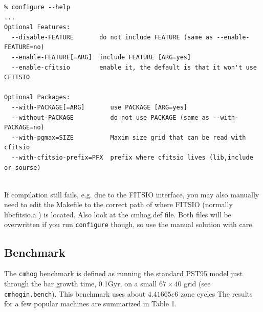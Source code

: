 \documentclass[10pt,dvips]{article}
\begin{document}
\begin{verbatim}
% configure --help
...
Optional Features:
  --disable-FEATURE       do not include FEATURE (same as --enable-FEATURE=no)
  --enable-FEATURE[=ARG]  include FEATURE [ARG=yes]
  --enable-cfitsio        enable it, the default is that it won't use CFITSIO
 
Optional Packages:
  --with-PACKAGE[=ARG]       use PACKAGE [ARG=yes]
  --without-PACKAGE          do not use PACKAGE (same as --with-PACKAGE=no)
  --with-pgmax=SIZE          Maxim size grid that can be read with cfitsio
  --with-cfitsio-prefix=PFX  prefix where cfitsio lives (lib,include or sourse)
 
\end{verbatim}

If compilation still fails, e.g. due to the FITSIO interface, you may also manually need to edit
the Makefile to the correct path of where FITSIO (normally libcfitsio.a ) is located. Also
look at the cmhog.def file. Both files will be overwritten if you run {\tt configure} though, so
use the manual solution with care.


\newpage
\subsection{Benchmark}

The  {\tt cmhog} benchmark is defined as running the
standard PST95 model just through the bar growth time, 0.1Gyr,
on a small $67 \times 40$ grid (see {\tt cmhogin.bench}). This
benchmark uses about $4.41665e6$ zone cycles
The results for a few popular machines are summarized
in Table 1.
\end{document}
